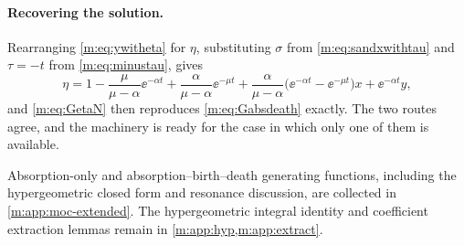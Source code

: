 \paragraph{Recovering the solution.}
Rearranging \cref{m:eq:ywitheta} for $\eta$, substituting $\sigma$ from
\cref{m:eq:sandxwithtau} and $\tau=-t$ from \cref{m:eq:minustau}, gives
\begin{equation*}
\eta = 1-\frac{\mu}{\mu-\alpha}\ee^{-\alpha t} + \frac{\alpha}{\mu-\alpha}\ee^{-\mu t}
+ \frac{\alpha}{\mu-\alpha}\bigl(\ee^{-\alpha t}-\ee^{-\mu t}\bigr)x
+ \ee^{-\alpha t}y ,
\end{equation*}
and \cref{m:eq:GetaN} then reproduces \cref{m:eq:Gabsdeath} exactly. The two routes
agree, and the machinery is ready for the case in which only one of them is
available.



\begin{remark}
\label{m:rem:moc-app}
Absorption-only and absorption--birth--death generating functions, including the
hypergeometric closed form and resonance discussion, are collected in
\cref{m:app:moc-extended}. The hypergeometric integral identity and coefficient
extraction lemmas remain in \cref{m:app:hyp,m:app:extract}.
\end{remark}
